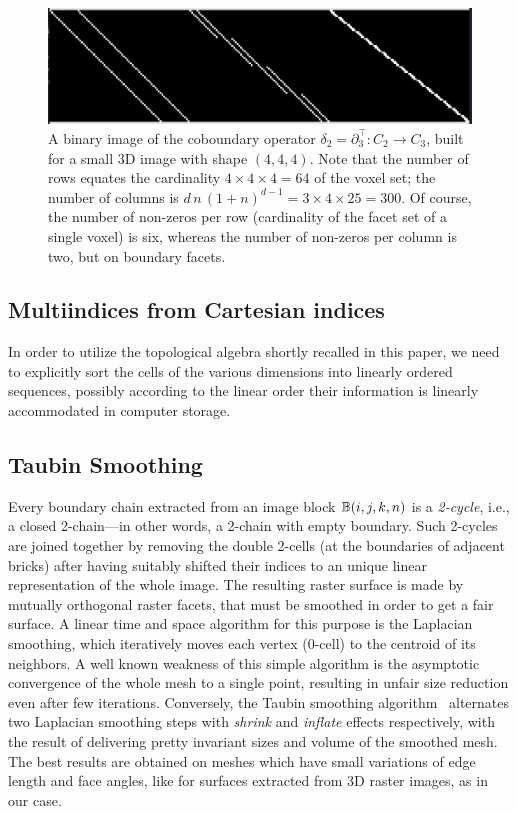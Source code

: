 \documentclass[11pt, oneside]{amsart}   	%
\begin{document}
\begin{figure}[tbp] %
   \centering
   \includegraphics[width=0.75\linewidth]{figs/boundary_matrix_4x4x4.pdf} 
   \caption{A binary image of the coboundary operator  $\delta_2 = \partial_3^\top : C_2 \to C_3$, built for a small 3D image with shape $(4,4,4)$. Note that the number of rows equates the cardinality $4\times 4\times 4 = 64$ of the voxel set; the number of columns is $d\,n\,(1+n)^{d-1} = 3\times 4\times 25 = 300$. Of course, the number of non-zeros per row (cardinality of the facet set of a single voxel) is six, whereas the number of non-zeros per column is two, but on boundary facets.}
   \label{fig:boundary_matrix_4x4x4}
\end{figure}

\subsection{Multiindices from Cartesian indices}\label{sec:inds-from-cart}

In order to utilize the topological algebra shortly recalled in this paper, we need to explicitly sort the cells of the various dimensions into linearly ordered sequences, possibly according to the linear order their information is linearly accommodated in computer storage. 

\subsection{Taubin Smoothing}\label{sec:taubin}

Every boundary chain extracted from an image block $\mathbb{B}(i,j,k,n)$ is a \emph{2-cycle}, i.e., a closed 2-chain---in other words, a 2-chain with empty boundary. Such 2-cycles are joined together by removing the double 2-cells (at the boundaries of adjacent bricks) after having suitably shifted their indices to an unique linear representation of the whole image. The resulting raster surface is made by mutually orthogonal raster facets, that must be smoothed in order to get a fair surface. A linear time and space algorithm for this purpose is the Laplacian smoothing, which iteratively  moves each vertex (0-cell) to the centroid of its neighbors. A well known weakness of this simple algorithm is the asymptotic convergence of the whole mesh to a single point, resulting in unfair size reduction even after few iterations.  Conversely, the Taubin smoothing algorithm~\cite{Taubin:1995:SPA:218380.218473,egst.20001029} alternates two Laplacian smoothing steps with \emph{shrink} and \emph{inflate} effects respectively, with the result of delivering pretty invariant sizes and volume of the smoothed mesh. The best results are obtained on meshes which have small variations of edge length and face angles, like for surfaces extracted from 3D raster images, as in our case.
 
\end{document}
